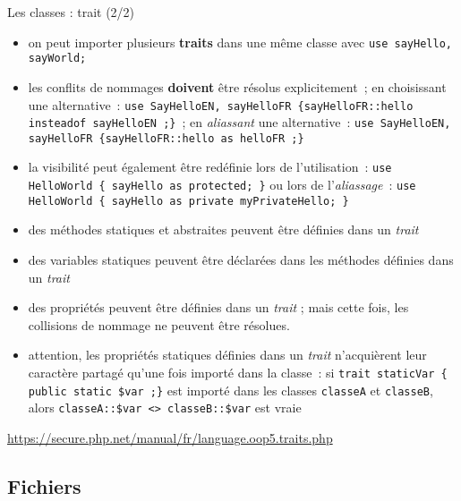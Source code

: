 \begin{frame}[containsverbatim]{Les classes : trait (2/2)}
	\begin{itemize}
		\item on peut importer plusieurs \textbf{traits} dans une même classe avec \lstinline!use sayHello, sayWorld;!
		\item les conflits de nommages \textbf{doivent} être résolus explicitement~; en choisissant une alternative~: \lstinline!use SayHelloEN, sayHelloFR {sayHelloFR::hello insteadof sayHelloEN ;}!~; en \textit{aliassant} une alternative~: \lstinline!use SayHelloEN, sayHelloFR {sayHelloFR::hello as helloFR ;}!
		\item la visibilité peut également être redéfinie lors de l'utilisation~: \lstinline!use HelloWorld { sayHello as protected; }! ou lors de l'\textit{aliassage}~: \lstinline!use HelloWorld { sayHello as private myPrivateHello; }!
		\item des méthodes statiques et abstraites peuvent être définies dans un \textit{trait}
		\item des variables statiques peuvent être déclarées dans les méthodes définies dans un \textit{trait}
		\item des propriétés peuvent être définies dans un \textit{trait} ; mais cette fois, les collisions de nommage ne peuvent être résolues.
		\item attention, les propriétés statiques définies dans un \textit{trait} n'acquièrent leur caractère partagé qu'une fois importé dans la classe~: si \lstinline!trait staticVar { public static $var ;}! est importé dans les classes \lstinline!classeA! et \lstinline!classeB!, alors \lstinline!classeA::$var <> classeB::$var! est vraie
	\end{itemize}
	\url{https://secure.php.net/manual/fr/language.oop5.traits.php}
\end{frame}

\subsection{Fichiers}

